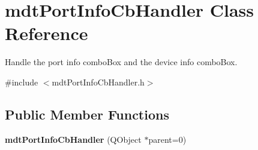 \hypertarget{classmdt_port_info_cb_handler}{
\section{mdtPortInfoCbHandler Class Reference}
\label{classmdt_port_info_cb_handler}
}


Handle the port info comboBox and the device info comboBox.  




{\ttfamily \#include $<$mdtPortInfoCbHandler.h$>$}

\subsection*{Public Member Functions}
\begin{DoxyCompactItemize}
\item 
\hypertarget{classmdt_port_info_cb_handler_a1495b2c7f83722aaef8b244604284b51}{
{\bfseries mdtPortInfoCbHandler} (QObject $\ast$parent=0)}
\label{classmdt_port_info_cb_handler_a1495b2c7f83722aaef8b244604284b51}


\end{DoxyCompactItemize}
